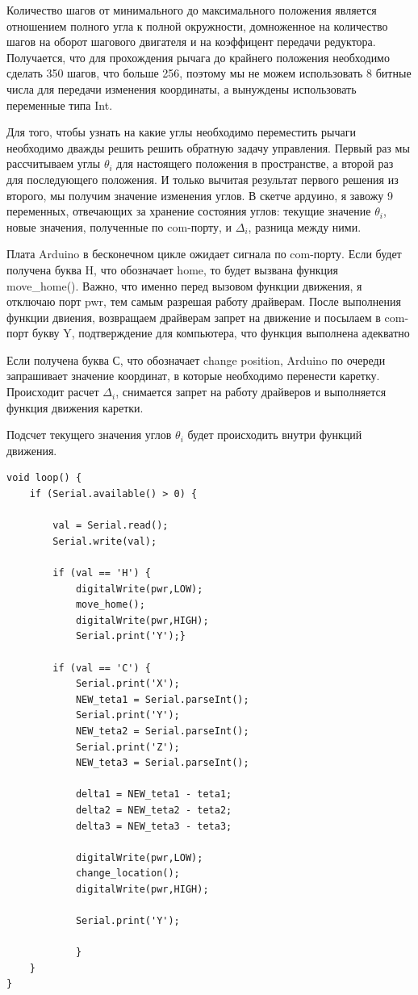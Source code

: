 Количество шагов от минимального до максимального положения является отношением полного угла к полной окружности, домноженное на количество шагов на оборот шагового двигателя и на коэффицент передачи редуктора. Получается, что для прохождения рычага до крайнего положения необходимо сделать 350 шагов, что больше 256, поэтому мы не можем использовать 8 битные числа для передачи изменения координаты, а вынуждены использовать переменные типа Int.

Для того, чтобы узнать на какие углы необходимо переместить рычаги необходимо дважды решить решить обратную задачу управления. Первый раз мы рассчитываем углы $\theta_{i}$ для настоящего положения в пространстве, а второй раз для последующего положения. И только вычитая результат первого решения из второго, мы получим значение изменения углов. 
В скетче ардуино, я завожу 9 переменных, отвечающих за хранение состояния углов: текущие значение $\theta_{i}$, новые значения, полученные по com-порту, и $\Delta_{i}$, разница между ними. 

Плата Arduino в бесконечном цикле ожидает сигнала по com-порту. Если будет получена буква H, что обозначает home, то будет вызвана функция move\_home(). Важно, что именно перед вызовом функции движения, я отключаю порт pwr, тем самым разрешая работу драйверам. После выполнения функции двиения, возвращаем драйверам запрет на движение и посылаем в com-порт букву Y, подтверждение для компьютера, что функция выполнена адекватно

Если получена буква С, что обозначает change position, Arduino по очереди запрашивает значение координат, в которые необходимо перенести каретку. Происходит расчет $\Delta_{i}$, снимается запрет на работу драйверов и выполняется функция движения каретки.

Подсчет текущего значения углов $\theta_{i}$ будет происходить внутри функций движения.
\begin{lstlisting}[style=uno,caption=Основная функция скетча]
void loop() {
    if (Serial.available() > 0) {

        val = Serial.read();
        Serial.write(val);

        if (val == 'H') { 
            digitalWrite(pwr,LOW);
            move_home();
            digitalWrite(pwr,HIGH);
            Serial.print('Y');}

        if (val == 'C') {
            Serial.print('X');
            NEW_teta1 = Serial.parseInt();
            Serial.print('Y');
            NEW_teta2 = Serial.parseInt();
            Serial.print('Z');
            NEW_teta3 = Serial.parseInt();
            
            delta1 = NEW_teta1 - teta1;
            delta2 = NEW_teta2 - teta2;
            delta3 = NEW_teta3 - teta3;
            
            digitalWrite(pwr,LOW);
            change_location();
            digitalWrite(pwr,HIGH);

            Serial.print('Y'); 

            }
    }
}
\end{lstlisting}

